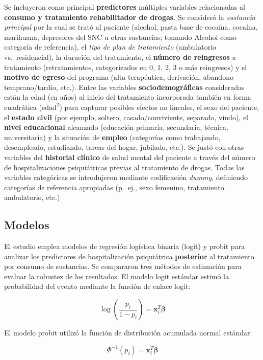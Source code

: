 \documentclass[
  spanish,
  10pt,
]{article}
\begin{document}
Se incluyeron como principal \textbf{predictores} múltiples variables
relacionadas al \textbf{consumo y tratamiento rehabilitador de drogas}.
Se consideró la \emph{sustancia principal} por la cual se trató al
paciente (alcohol, pasta base de cocaína, cocaína, marihuana, depresores
del SNC u otras sustancias; tomando Alcohol como categoría de
referencia), el \emph{tipo de plan de tratamiento} (ambulatorio
vs.~residencial), la duración del tratamiento, el \textbf{número de
reingresos} a tratamiento (retratamientos, categorizados en 0, 1, 2, 3 o
más reingresos) y el \textbf{motivo de egreso} del programa (alta
terapéutica, derivación, abandono temprano/tardío, etc.). Entre las
variables \textbf{sociodemográficas} consideradas están la edad (en
años) al inicio del tratamiento incorporada también en forma cuadrática
(\(\text{edad}^2\)) para capturar posibles efectos no lineales, el sexo
del paciente, el \textbf{estado civil} (por ejemplo, soltero,
casado/conviviente, separado, viudo), el \textbf{nivel educacional}
alcanzado (educación primaria, secundaria, técnica, universitaria) y la
situación de \textbf{empleo} (categorías como trabajando, desempleado,
estudiando, tareas del hogar, jubilado, etc.). Se justó con otras
variables del \textbf{historial clínico} de salud mental del paciente a
través del número de hospitalizaciones psiquiátricas previas al
tratamiento de drogas. Todas las variables categóricas se introdujeron
mediante codificación \emph{dummy}, definiendo categorías de referencia
apropiadas (p.~ej., sexo femenino, tratamiento ambulatorio, etc.)

\subsection{Modelos}\label{modelos}

El estudio emplea modelos de regresión logística binaria (logit) y
probit para analizar los predictores de hospitalización psiquiátrica
\textbf{posterior} al tratamiento por consumo de sustancias. Se
compararon tres métodos de estimación para evaluar la robustez de los
resultados. El modelo logit estándar estimó la probabilidad del evento
mediante la función de enlace logit:

\[\log\left(\frac{p_i}{1-p_i}\right) = \mathbf{x}_i^T\boldsymbol{\beta}\]

El modelo probit utilizó la función de distribución acumulada normal
estándar:

\[\Phi^{-1}(p_i) = \mathbf{x}_i^T\boldsymbol{\beta}\]
\end{document}
